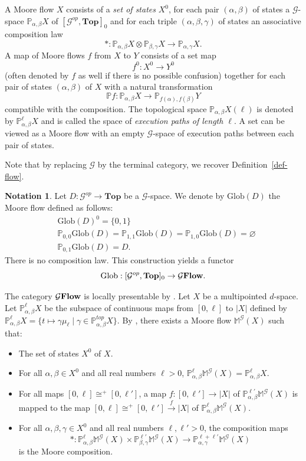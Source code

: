\documentclass[a4paper,12pt]{amsart}
\newcommand{\p}{\times}
\renewcommand{\P}{\mathbb{P}}
\theoremstyle{definition}
\newtheorem{nota}[thm]{Notation}
\renewcommand{\top}{{\mathbf{Top}}}
\newcommand{\iso}{\cong}
\newcommand{\ot}{\otimes}
\newcommand{\moore}{{\mathbb{M}}}
\newcommand{\brm}[1]{{\rm{\mathbf{#1}}}}
\newcommand{\dtopG}{{\mathcal{G}\brm{Flow}}}
\newcommand{\glob}{{\mathrm{Glob}}}
\newcommand{\topdgr}{[\mathcal{G}^{op},\top]}
\renewcommand{\P}{\mathbb{P}}
\begin{document}
A Moore flow $X$ consists of a \emph{set of states} $X^0$, for each pair $(\alpha,\beta)$ of states a $\mathcal{G}$-space $\P_{\alpha,\beta}X$ of $\topdgr_0$ and for each triple $(\alpha,\beta,\gamma)$ of states an associative composition law \[*:\P_{\alpha,\beta}X \ot \P_{\beta,\gamma}X \to \P_{\alpha,\gamma}X.\] A map of Moore flows $f$ from $X$ to $Y$ consists of a set map \[f^0:X^0 \to Y^0\] (often denoted by $f$ as well if there is no possible confusion) together for each pair of states $(\alpha,\beta)$ of $X$ with a natural transformation \[\P f:\P_{\alpha,\beta}X \longrightarrow \P_{f(\alpha),f(\beta)}Y\] compatible with the composition. The topological space $\P_{\alpha,\beta}X(\ell)$ is denoted by $\P_{\alpha,\beta}^\ell X$ and is called the space of \emph{execution paths of length $\ell$}. A set can be viewed as a Moore flow with an empty $\mathcal{G}$-space of execution paths between each pair of states.


Note that by replacing $\mathcal{G}$ by the terminal category, we recover Definition~\ref{def-flow}.


\begin{nota}
	Let $D:\mathcal{G}^{op}\to \top$ be a $\mathcal{G}$-space. We denote by $\glob(D)$ the Moore flow defined as follows: 
	\[
	\begin{aligned}
		&\glob(D)^0 = \{0,1\}\\
		&\P_{0,0}\glob(D)=\P_{1,1}\glob(D)=\P_{1,0}\glob(D)=\varnothing\\
		&\P_{0,1}\glob(D)=D.
	\end{aligned}	
	\]
	There is no composition law. This construction yields a functor \[\glob:\topdgr_0\to \dtopG.\]
\end{nota}

The category $\dtopG$ is locally presentable by \cite[Theorem~6.11]{Moore1}. Let $X$ be a multipointed $d$-space. Let $\P^\ell_{\alpha,\beta}X$ be the subspace of continuous maps from $[0,\ell]$ to $|X|$ defined by $\P^\ell_{\alpha,\beta}X = \{t\mapsto \gamma\mu_\ell\mid \gamma\in \P^{top}_{\alpha,\beta}X\}$. By \cite[Theorem~4.12]{Moore2}, there exists a Moore flow $\moore^{\mathcal{G}}(X)$ such that: 
\begin{itemize}
	\item The set of states $X^0$ of $X$.
	\item For all $\alpha,\beta\in X^0$ and all real numbers $\ell>0$, $\P_{\alpha,\beta}^{\ell}\moore^{\mathcal{G}}(X) = \P_{\alpha,\beta}^{\ell}X$.
	\item For all maps $[0,\ell]\iso^+[0,\ell']$, a map $f:[0,\ell']\to |X|$ of $\P_{\alpha,\beta}^{\ell'}\moore^{\mathcal{G}}(X)$ is mapped to the map $[0,\ell]\iso^+[0,\ell']\stackrel{f}\to |X|$ of $\P_{\alpha,\beta}^{\ell}\moore^{\mathcal{G}}(X)$.
	\item For all $\alpha,\beta,\gamma\in X^0$ and all real numbers $\ell,\ell'>0$, the composition maps \[*:\P_{\alpha,\beta}^{\ell}\moore^{\mathcal{G}}(X) \p \P_{\beta,\gamma}^{\ell'}\moore^{\mathcal{G}}(X) \to \P_{\alpha,\gamma}^{\ell+\ell'}\moore^{\mathcal{G}}(X)\] is the Moore composition.
\end{itemize}
\end{document}
